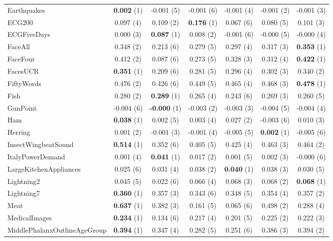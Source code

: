 \begin{table}[ht]
\begin{adjustbox}{width=\textwidth}
\begin{tabular}{lcccccc}
    Earthquakes & \textbf{0.002} (1) & -0.001 (5) & -0.001 (6) & -0.001 (4) & -0.001 (2) & -0.001 (3) \\
    ECG200 & 0.097 (4) & 0.109 (2) & \textbf{0.176} (1) & 0.067 (6) & 0.080 (5) & 0.101 (3) \\
    ECGFiveDays & 0.000 (3) & \textbf{0.087} (1) & 0.008 (2) & -0.001 (6) & -0.000 (5) & -0.000 (4) \\
    FaceAll & 0.348 (2) & 0.213 (6) & 0.279 (5) & 0.297 (4) & 0.317 (3) & \textbf{0.353} (1) \\
    FaceFour & 0.412 (2) & 0.087 (6) & 0.273 (5) & 0.328 (3) & 0.312 (4) & \textbf{0.422} (1) \\
    FacesUCR & \textbf{0.351} (1) & 0.209 (6) & 0.281 (5) & 0.296 (4) & 0.302 (3) & 0.340 (2) \\
    FiftyWords & 0.476 (2) & 0.426 (6) & 0.449 (5) & 0.465 (4) & 0.468 (3) & \textbf{0.478} (1) \\
    Fish & 0.280 (2) & \textbf{0.289} (1) & 0.265 (4) & 0.243 (6) & 0.269 (3) & 0.260 (5) \\
    GunPoint & -0.004 (6) & \textbf{-0.000} (1) & -0.003 (2) & -0.003 (3) & -0.004 (5) & -0.004 (4) \\
    Ham & \textbf{0.038} (1) & 0.002 (5) & 0.003 (4) & 0.027 (2) & -0.003 (6) & 0.010 (3) \\
    Herring & 0.001 (2) & -0.001 (3) & -0.001 (4) & -0.005 (5) & \textbf{0.002} (1) & -0.005 (6) \\
    InsectWingbeatSound & \textbf{0.514} (1) & 0.352 (6) & 0.405 (5) & 0.425 (4) & 0.463 (3) & 0.464 (2) \\
    ItalyPowerDemand & 0.001 (4) & \textbf{0.041} (1) & 0.017 (2) & 0.001 (5) & 0.002 (3) & -0.000 (6) \\
    LargeKitchenAppliances & 0.025 (6) & 0.031 (4) & 0.038 (2) & \textbf{0.040} (1) & 0.038 (3) & 0.030 (5) \\
    Lightning2 & 0.045 (5) & 0.022 (6) & 0.066 (4) & 0.068 (3) & 0.068 (2) & \textbf{0.068} (1) \\
    Lightning7 & \textbf{0.360} (1) & 0.357 (3) & 0.343 (6) & 0.348 (5) & 0.354 (4) & 0.357 (2) \\
    Meat & \textbf{0.637} (1) & 0.382 (3) & 0.161 (5) & 0.065 (6) & 0.498 (2) & 0.288 (4) \\
    MedicalImages & \textbf{0.234} (1) & 0.134 (6) & 0.217 (4) & 0.201 (5) & 0.225 (2) & 0.222 (3) \\
    MiddlePhalanxOutlineAgeGroup & \textbf{0.394} (1) & 0.347 (4) & 0.282 (5) & 0.251 (6) & 0.386 (3) & 0.394 (2) \\

\end{tabular}
\end{adjustbox}
\end{table}
